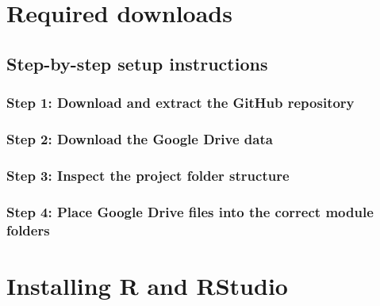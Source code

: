 \documentclass[
  10pt,
  b5paper,
  oneside]{book}
\begin{document}
\section*{Required downloads}\label{required-downloads}

\subsection*{Step-by-step setup instructions}\label{step-by-step-setup-instructions}

\subsubsection*{Step 1: Download and extract the GitHub repository}\label{step-1-download-and-extract-the-github-repository}

\subsubsection*{Step 2: Download the Google Drive data}\label{step-2-download-the-google-drive-data}

\subsubsection*{Step 3: Inspect the project folder structure}\label{step-3-inspect-the-project-folder-structure}

\subsubsection*{Step 4: Place Google Drive files into the correct module folders}\label{step-4-place-google-drive-files-into-the-correct-module-folders}

\section*{Installing R and RStudio}\label{installing-r-and-rstudio}
\end{document}
